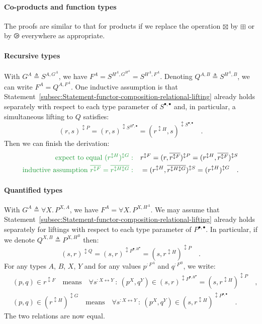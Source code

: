 \paragraph{Co-products and function types}

The proofs are similar to that for products if we replace the operation
$\boxtimes$ by $\boxplus$ or by $\ogreaterthan$ everywhere as appropriate.

\paragraph{Recursive types}

With $G^{A}\triangleq S^{A,G^{A}}$, we have $F^{A}=S^{H^{A},G^{H^{A}}}=S^{H^{A},F^{A}}$.
Denoting $Q^{A,B}\triangleq S^{H^{A},B}$, we can write $F^{A}=Q^{A,F^{A}}$.
One inductive assumption is that Statement~\ref{subsec:Statement-functor-composition-relational-lifting}
already holds separately with respect to each type parameter of $S^{\bullet,\bullet}$
and, in particular, a simultaneous lifting to $Q$ satisfies:
\[
(r,s)^{\updownarrow P}=(r,s)^{\updownarrow S^{H^{\bullet},\bullet}}=(r^{\updownarrow H},s)^{\updownarrow S^{\bullet,\bullet}}\quad.
\]
Then we can finish the derivation:
\begin{align*}
{\color{greenunder}\text{expect to equal }(r^{\updownarrow H})^{\updownarrow G}:}\quad & r^{\updownarrow F}=(r,\overline{r^{\updownarrow F}})^{\updownarrow P}=(r^{\updownarrow H},\overline{r^{\updownarrow F}})^{\updownarrow S}\\
{\color{greenunder}\text{inductive assumption }\overline{r^{\updownarrow F}}=\overline{r^{\updownarrow H\updownarrow G}}:}\quad & =(r^{\updownarrow H},\overline{r^{\updownarrow H\updownarrow G}})^{\updownarrow S}=(r^{\updownarrow H})^{\updownarrow G}\quad.
\end{align*}


\paragraph{Quantified types}

With $G^{A}\triangleq\forall X.\,P^{X,A}$, we have $F^{A}=\forall X.\,P^{X,H^{A}}$.
We may assume that Statement~\ref{subsec:Statement-functor-composition-relational-lifting}
already holds separately for liftings with respect to each type parameter
of $P^{\bullet,\bullet}$. In particular, if we denote $Q^{X,B}\triangleq P^{X,H^{B}}$
then:
\[
(s,r)^{\updownarrow Q}=(s,r)^{\updownarrow P^{\bullet,H^{\bullet}}}=(s,r^{\updownarrow H})^{\updownarrow P}\quad.
\]
For any types $A$, $B$, $X$, $Y$ and for any values $p^{:F^{A}}$
and $q^{:F^{B}}$, we write:
\begin{align*}
 & (p,q)\in r^{\updownarrow F}\quad\text{means}\quad\forall s^{:X\leftrightarrow Y}\,:\:(p^{X},q^{Y})\in(s,r)^{\updownarrow P^{\bullet,H^{\bullet}}}=(s,r^{\updownarrow H})^{\updownarrow P}\quad,\\
 & (p,q)\in(r^{\updownarrow H})^{\updownarrow G}\quad\text{means}\quad\forall s^{:X\leftrightarrow Y}\,:\:(p^{X},q^{Y})\in(s,r^{\updownarrow H})^{\updownarrow P^{\bullet,\bullet}}\quad.
\end{align*}
The two relations are now equal. 

